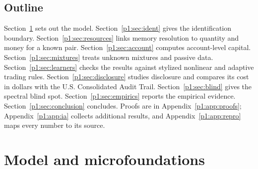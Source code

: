 \subsection{Outline}
Section~\ref{p1:sec:model} sets out the model. Section~\ref{p1:sec:ident} gives the identification boundary. Section~\ref{p1:sec:resources} links memory resolution to quantity and money for a known pair. Section~\ref{p1:sec:account} computes account-level capital. Section~\ref{p1:sec:mixtures} treats unknown mixtures and passive data. Section~\ref{p1:sec:learners} checks the results against stylized nonlinear and adaptive trading rules. Section~\ref{p1:sec:disclosure} studies disclosure and compares its cost in dollars with the U.S. Consolidated Audit Trail. Section~\ref{p1:sec:blind} gives the spectral blind spot. Section~\ref{p1:sec:empirics} reports the empirical evidence. Section~\ref{p1:sec:conclusion} concludes. Proofs are in Appendix~\ref{p1:app:proofs}; Appendix~\ref{p1:app:ia} collects additional results, and Appendix~\ref{p1:app:repro} maps every number to its source.

\section{Model and microfoundations}\label{p1:sec:model}

